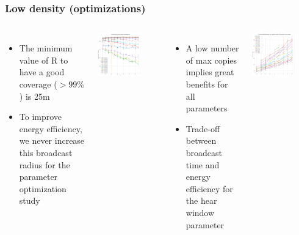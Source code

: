 \documentclass[aspectratio=169]{beamer}
\begin{document}
\begin{frame}
	\frametitle{Low density (optimizations)}
	\footnotesize
	\begin{columns}
	        \begin{itemize}
	        \item The minimum value of R to have a good coverage (\(> 99\%\)) is 25m
	        \item To improve energy efficiency, we never increase this broadcast radius for the parameter optimization study
	        \end{itemize}
	        \begin{center}
	            \includegraphics[width=0.7\textwidth]{img/ld/messages-R-ffplot.png}
	        \end{center}
	        \begin{itemize}
	        \item A low number of max copies implies great benefits for all parameters
	        \item Trade-off between broadcast time and energy efficiency for the hear window parameter
	        \end{itemize}
	        \begin{center}
	            \includegraphics[width=0.7\textwidth]{img/ld/broadcasttime-T-ffplot.png}
	        \end{center}
	\end{columns}
\end{frame}
\end{document}
